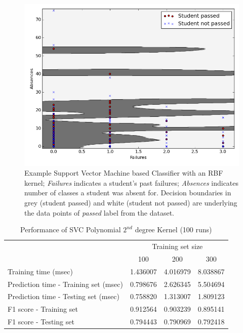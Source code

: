 \documentclass{article}
\begin{document}
	\begin{figure}[t]
		\centering
		\includegraphics[scale=0.5]{example_svc}
		\caption{Example Support Vector Machine based Classifier with an RBF kernel; \emph{Failures} indicates a student's past failures; \emph{Absences} indicates number of classes a student was absent for. Decision boundaries in grey (student passed) and white (student not passed) are underlying the data points of \emph{passed} label from the dataset.}
		\label{fig:svc_rbf_example}
	\end{figure}
	
	\begin{table}[h]
		\centering
		\begin{tabular}{l|ccc}
			\toprule
			{} & \multicolumn{3}{c}{Training set size} \\
			{} &       100 &       200 &       300 \\
			\midrule
			Training time (msec)                  &  1.436007 &  4.016979 &  8.038867 \\
			Prediction time - Training set (msec) &  0.798676 &  2.626345 &  5.504694 \\
			Prediction time - Testing set (msec)  &  0.758820 &  1.313007 &  1.809123 \\
			F1 score - Training set               &  0.912564 &  0.903239 &  0.895141 \\
			F1 score - Testing set                &  0.794443 &  0.790969 &  0.792418 \\
			\bottomrule
		\end{tabular}
		\caption{Performance of SVC Polynomial $2^{nd}$ degree Kernel (100 runs)}
		\label{tab:svc_poly_100}
	\end{table}
	
\end{document}
